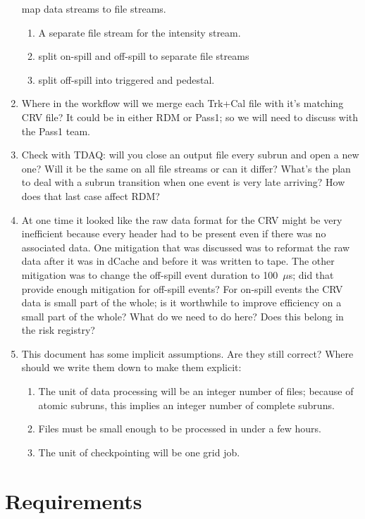 \begin{enumerate}
  map data streams to file streams.
  \begin{enumerate}
    \item A separate file stream for the intensity stream.
    \item split on-spill and off-spill to separate file streams
    \item split off-spill into triggered and pedestal.
  \end{enumerate}
\item Where in the workflow will we merge each Trk+Cal file with it's matching CRV file?
  It could be in either RDM or Pass1; so we will need to discuss with the Pass1 team.
\item Check with TDAQ: will you close an output file every subrun and open a new one? Will it be the same
  on all file streams or can it differ?  What's the plan to deal with a subrun transition when one
  event is very late arriving?  How does that last case affect RDM?
\item At one time it looked like the raw data format for the CRV might be very inefficient
  because every header had to be present even if there was no associated data.
  One mitigation that was discussed was to reformat the raw data after it was in dCache and before it was written to tape.
  The other mitigation was to change the off-spill event duration to 100~$\mu$s; did that provide enough mitigation for off-spill events?
  For on-spill events the CRV data is small part of the whole; is it worthwhile to improve efficiency on a small part of the whole?
  What do we need to do here?  Does this belong in the risk registry?
\item This document has some implicit assumptions.  Are they still correct?  Where should we write them down to make them explicit:
  \begin{enumerate}
  \item The unit of data processing will be an integer number of files; because of atomic subruns, this implies an integer number
    of complete subruns.
  \item Files must be small enough to be processed in under a few hours.
  \item The unit of checkpointing will be one grid job.
  \end{enumerate}
\end{enumerate}


\chapter{Requirements}
\label{ch:requirements}

